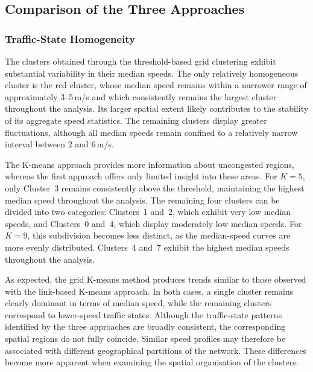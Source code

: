 \documentclass[11pt,a4paper]{article}
\begin{document}
\subsection{Comparison of the Three Approaches}
\label{sec:eval:compare}

\subsubsection{Traffic-State Homogeneity}

The clusters obtained through the threshold-based grid clustering exhibit substantial variability in their median speeds. The only relatively homogeneous cluster is the red cluster, whose median speed remains within a narrower range of approximately 3--5\,m/s and which consistently remains the largest cluster throughout the analysis. Its larger spatial extent likely contributes to the stability of its aggregate speed statistics. The remaining clusters display greater fluctuations, although all median speeds remain confined to a relatively narrow interval between 2 and 6\,m/s.

The K-means approach provides more information about uncongested regions, whereas the first approach offers only limited insight into these areas. For $K=5$, only Cluster~3 remains consistently above the threshold, maintaining the highest median speed throughout the analysis. The remaining four clusters can be divided into two categories: Clusters~1 and~2, which exhibit very low median speeds, and Clusters~0 and~4, which display moderately low median speeds.
For $K=9$, this subdivision becomes less distinct, as the median-speed curves are more evenly distributed. Clusters~4 and~7 exhibit the highest median speeds throughout the analysis.

As expected, the grid K-means method produces trends similar to those observed with the link-based K-means approach. In both cases, a single cluster remains clearly dominant in terms of median speed, while the remaining clusters correspond to lower-speed traffic states. Although the traffic-state patterns identified by the three approaches are broadly consistent, the corresponding spatial regions do not fully coincide. Similar speed profiles may therefore be associated with different geographical partitions of the network. These differences become more apparent when examining the spatial organisation of the clusters.
\end{document}
